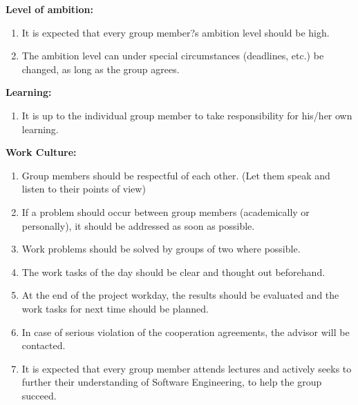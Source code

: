 \documentclass[../ProjectFoundation.tex]{subfiles}
\begin{document}
\textbf{Level of ambition:}
\begin{enumerate}
	\item It is expected that every group member?s ambition level should be high.
	\item The ambition level can under special circumstances (deadlines, etc.) be changed, as long as the group agrees.
\end{enumerate}
\textbf{Learning:}
\begin{enumerate}
	\item It is up to the individual group member to take responsibility for his/her own learning.
\end{enumerate}
\textbf{Work Culture:}
\begin{enumerate}
	\item Group members should be respectful of each other. (Let them speak and listen to their points of view)
	\item If a problem should occur between group members (academically or personally), it should be addressed as soon as possible.
	\item Work problems should be solved by groups of two where possible.
	\item The work tasks of the day should be clear and thought out beforehand.
	\item At the end of the project workday, the results should be evaluated and the work tasks for next time should be planned.
	\item In case of serious violation of the cooperation agreements, the advisor will be contacted.
	\item It is expected that every group member attends lectures and actively seeks to further their understanding of Software Engineering, to help the group succeed.
\end{enumerate}
\end{document}
